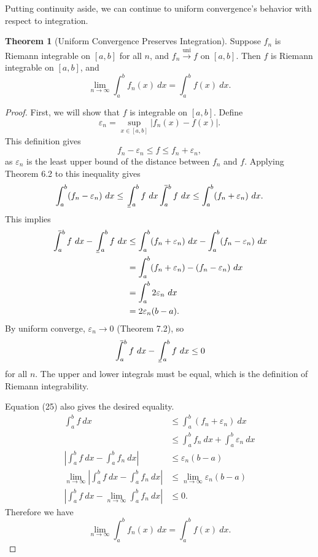 \documentclass{article}
\def\upint{\mathchoice%
	{\mkern13mu\overline{\vphantom{\intop}\mkern7mu}\mkern-20mu}%
	{\mkern7mu\overline{\vphantom{\intop}\mkern7mu}\mkern-14mu}%
	{\mkern7mu\overline{\vphantom{\intop}\mkern7mu}\mkern-14mu}%
	{\mkern7mu\overline{\vphantom{\intop}\mkern7mu}\mkern-14mu}%
	\int}
\def\lowint{\mkern3mu\underline{\vphantom{\intop}\mkern7mu}\mkern-10mu\int}
\newcommand{\uni}{\overset{\text{uni}}{\to}}
\theoremstyle{definition}
\newtheorem{theorem}{Theorem}[section]
\begin{document}
	Putting continuity aside, we can continue to uniform convergence's behavior with respect to integration. 
	\begin{theorem}[Uniform Convergence Preserves Integration]
		Suppose $ f_n $ is Riemann integrable on $ [a,b] $ for all $ n $, and $ f_n\uni f $ on $ [a,b] $. Then $ f $ is Riemann integrable on $ [a,b] $, and $$ \lim\limits_{n\to\infty}\int_{a}^{b}f_n(x)\ dx=\int_a^bf(x)\ dx.$$
	\end{theorem}
	\begin{proof}
		First, we will show that $ f $ is integrable on $ [a,b] $. Define $$ \varepsilon_n=\sup_{x\in [a,b]}|f_n(x)-f(x)|.$$ This definition gives $$ f_n-\varepsilon_n\le f\le f_n+\varepsilon_n, $$ as $ \varepsilon_n $ is the least upper bound of the distance between $ f_n $ and $ f $. Applying Theorem 6.2 to this inequality gives 
		\begin{align}
			\int_{a}^{b}(f_n-\varepsilon_n)\ dx\le\lowint_{a}^b f \ dx\upint_{a}^b f \ dx\le \int_{a}^{b}(f_n+\varepsilon_n)\ dx.
		\end{align}
		This implies 
		\begin{align*}
			\upint_{a}^b f \ dx - \lowint_{a}^b f \ dx&\le  \int_{a}^{b}(f_n+\varepsilon_n)\ dx - \int_{a}^{b}(f_n-\varepsilon_n)\ dx\\
			&= \int_{a}^{b}(f_n+\varepsilon_n) - (f_n-\varepsilon_n) \ dx\\&=\int_{a}^{b}2\varepsilon_n \ dx\\ &= 2\varepsilon_n (b-a).
		\end{align*}
		By uniform converge, $ \varepsilon_n\to 0 $ (Theorem 7.2), so $$	\upint_{a}^b f \ dx - \lowint_{a}^b f \ dx\le 0 $$ for all $ n $. The upper and lower integrals must be equal, which is the definition of Riemann integrability. 
		
		Equation (25) also gives the desired equality. 
		\begin{align*}
			\int_{a}^b f \ dx&\le \int_{a}^{b}(f_n+\varepsilon_n)\ dx\\
			&\le \int_{a}^{b}f_n\ dx + \int_{a}^{b}\varepsilon_n\ dx\\
			\left\lvert\int_{a}^{b}f\ dx -\int_{a}^{b}f_n\ dx\right\rvert&\le \varepsilon_n(b-a)\\
			\lim_{n\to\infty}\left\lvert\int_{a}^{b}f\ dx -\int_{a}^{b}f_n\ dx\right\rvert&\le \lim_{n\to\infty}\varepsilon_n(b-a)\\
			\left\lvert\int_{a}^{b}f\ dx -\lim_{n\to\infty}\int_{a}^{b}f_n\ dx\right\rvert&\le0.
		\end{align*}
		Therefore we have $$ \lim\limits_{n\to\infty}\int_{a}^{b}f_n(x)\ dx=\int_a^bf(x)\ dx.$$
	\end{proof}
	
\end{document}
